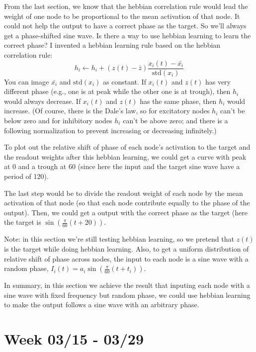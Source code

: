 \documentclass[12pt, a4paper]{article}
\begin{document}
From the last section, we know that the hebbian correlation rule would lead the weight of one node to be proportional to the mean activation of that node. It could not help the output to have a correct phase as the target. So we'll always get a phase-shifted sine wave. Is there a way to use hebbian learning to learn the correct phase? I invented a hebbian learning rule based on the hebbian correlation rule: $$h_i \leftarrow h_i + (z(t) - \bar{z}) \frac{x_i(t) - \bar{x_i}}{\text{std}(x_i)}$$
You can image $\bar{x_i}$ and $\text{std}(x_i)$ as constant. If $x_i(t)$ and $z(t)$ has very different phase (e.g., one is at peak while the other one is at trough), then $h_i$ would always decrease. If $x_i(t)$ and $z(t)$ has the same phase, then $h_i$ would increase. (Of course, there is the Dale's law, so for excitatory nodes $h_i$ can't be below zero and for inhibitory nodes $h_i$ can't be above zero; and there is a following normalization to prevent increasing or decreasing infinitely.)

To plot out the relative shift of phase of each node's activation to the target and the readout weights after this hebbian learning, we could get a curve with peak at 0 and a trough at 60 (since here the input and the target sine wave have a period of 120). 

% 

The last step would be to divide the readout weight of each node by the mean activation of that node (so that each node contribute equally to the phase of the output). Then, we could get a output with the correct phase as the target (here the target is $\sin(\frac{\pi}{60}(t+20))$.

% 

Note: in this section we're still testing hebbian learning, so we pretend that $z(t)$ is the target while doing hebbian learning. Also, to get a uniform distribution of relative shift of phase across nodes, the input to each node is a sine wave with a random phase, $I_i(t) = a_i \sin(\frac{\pi}{60}(t+t_i))$. 

In summary, in this section we achieve the result that inputing each node with a sine wave with fixed frequency but random phase, we could use hebbian learning to make the output follows a sine wave with an arbitrary phase.

\newpage

\section*{Week 03/15 - 03/29}
\end{document}
